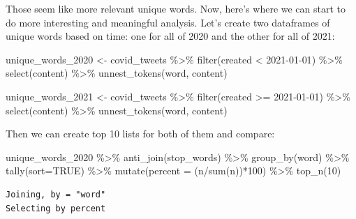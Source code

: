 \documentclass[
  letterpaper,
  DIV=11,
  numbers=noendperiod]{scrreprt}
\newenvironment{Shaded}{\begin{snugshade}}{\end{snugshade}}
\newcommand{\AttributeTok}[1]{\textcolor[rgb]{0.40,0.45,0.13}{#1}}
\newcommand{\ConstantTok}[1]{\textcolor[rgb]{0.56,0.35,0.01}{#1}}
\newcommand{\DecValTok}[1]{\textcolor[rgb]{0.68,0.00,0.00}{#1}}
\newcommand{\FunctionTok}[1]{\textcolor[rgb]{0.28,0.35,0.67}{#1}}
\newcommand{\NormalTok}[1]{\textcolor[rgb]{0.00,0.23,0.31}{#1}}
\newcommand{\OtherTok}[1]{\textcolor[rgb]{0.00,0.23,0.31}{#1}}
\newcommand{\SpecialCharTok}[1]{\textcolor[rgb]{0.37,0.37,0.37}{#1}}
\newcommand{\StringTok}[1]{\textcolor[rgb]{0.13,0.47,0.30}{#1}}
\begin{document}
Those seem like more relevant unique words. Now, here's where we can
start to do more interesting and meaningful analysis. Let's create two
dataframes of unique words based on time: one for all of 2020 and the
other for all of 2021:

\begin{Shaded}
\begin{Highlighting}[]
\NormalTok{unique\_words\_2020 }\OtherTok{\textless{}{-}}\NormalTok{ covid\_tweets }\SpecialCharTok{\%\textgreater{}\%}
  \FunctionTok{filter}\NormalTok{(created }\SpecialCharTok{\textless{}} \StringTok{\textquotesingle{}2021{-}01{-}01\textquotesingle{}}\NormalTok{) }\SpecialCharTok{\%\textgreater{}\%}
  \FunctionTok{select}\NormalTok{(content) }\SpecialCharTok{\%\textgreater{}\%}
  \FunctionTok{unnest\_tokens}\NormalTok{(word, content)}

\NormalTok{unique\_words\_2021 }\OtherTok{\textless{}{-}}\NormalTok{ covid\_tweets }\SpecialCharTok{\%\textgreater{}\%}
  \FunctionTok{filter}\NormalTok{(created }\SpecialCharTok{\textgreater{}=} \StringTok{\textquotesingle{}2021{-}01{-}01\textquotesingle{}}\NormalTok{) }\SpecialCharTok{\%\textgreater{}\%}
  \FunctionTok{select}\NormalTok{(content) }\SpecialCharTok{\%\textgreater{}\%}
  \FunctionTok{unnest\_tokens}\NormalTok{(word, content)}
\end{Highlighting}
\end{Shaded}

Then we can create top 10 lists for both of them and compare:

\begin{Shaded}
\begin{Highlighting}[]
\NormalTok{unique\_words\_2020 }\SpecialCharTok{\%\textgreater{}\%}
  \FunctionTok{anti\_join}\NormalTok{(stop\_words) }\SpecialCharTok{\%\textgreater{}\%}
  \FunctionTok{group\_by}\NormalTok{(word) }\SpecialCharTok{\%\textgreater{}\%}
  \FunctionTok{tally}\NormalTok{(}\AttributeTok{sort=}\ConstantTok{TRUE}\NormalTok{) }\SpecialCharTok{\%\textgreater{}\%}
  \FunctionTok{mutate}\NormalTok{(}\AttributeTok{percent =}\NormalTok{ (n}\SpecialCharTok{/}\FunctionTok{sum}\NormalTok{(n))}\SpecialCharTok{*}\DecValTok{100}\NormalTok{) }\SpecialCharTok{\%\textgreater{}\%}
  \FunctionTok{top\_n}\NormalTok{(}\DecValTok{10}\NormalTok{)}
\end{Highlighting}
\end{Shaded}

\begin{verbatim}
Joining, by = "word"
Selecting by percent
\end{verbatim}
\end{document}
